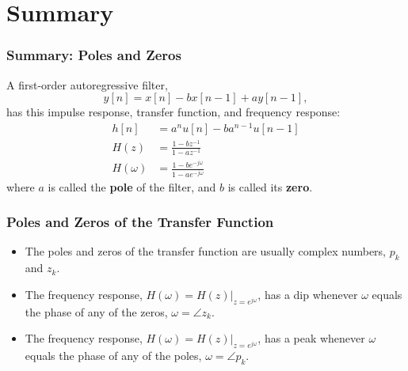 \documentclass{beamer}
\begin{document}
\section[Summary]{Summary}
\setcounter{subsection}{1}

\begin{frame}
  \frametitle{Summary: Poles and Zeros}
  A first-order autoregressive filter,
  \[
  y[n] = x[n]-bx[n-1]+ay[n-1],
  \]
  has this impulse response, transfer function, and frequency response:
  \begin{align*}
    h[n]&=a^n u[n]-ba^{n-1}u[n-1]\\
    H(z)  &= \frac{1-bz^{-1}}{1-az^{-1}}\\
    H(\omega)  &= \frac{1-be^{-j\omega}}{1-ae^{-j\omega}}
  \end{align*}
  where $a$ is called the {\bf pole} of the filter, and $b$ is called
  its {\bf zero}.
\end{frame}

\begin{frame}
  \frametitle{Poles and Zeros of the Transfer Function}
  \begin{itemize}
  \item The poles and zeros of the transfer function are usually complex numbers, $p_k$ and $z_k$.
  \item The frequency response, $H(\omega) = H(z)\vert_{z=e^{j\omega}}$, has a dip
    whenever $\omega$ equals the phase of any of the zeros, $\omega=\angle z_k$.
  \item The frequency response, $H(\omega) = H(z)\vert_{z=e^{j\omega}}$, has a peak
    whenever $\omega$ equals the phase of any of the poles, $\omega=\angle p_k$.
  \end{itemize}
\end{frame}
\end{document}
